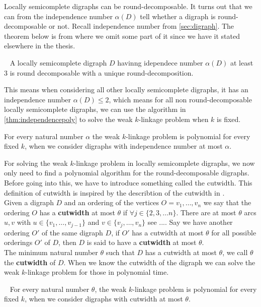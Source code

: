 Locally semicomplete digraphs can be round-decomposable. It turns out that we can from the independence number $\alpha (D)$ tell whether a digraph is round-decomposable or not.
Recall independence number from \autoref{sec:digraph}. 
The theorem below is from \cite{bangJGT77} where we omit some part of it since we have it stated elsewhere in the thesis.
\begin{thm}~\cite{bangJGT77}
    A locally semicomplete digraph $D$ havinng idependece number $\alpha (D)$ at least 3 is round decomposable with a unique round-decomposition. 
    \label{thm:independenceround}
\end{thm} 
This means when considering all other locally semicomplete digraphs, it has an independence number $\alpha (D) \leq 2$, which means for all non round-decomposable locally semicomplete digraphs, we can use the algorithm in \autoref{thm:independencepoly} to solve the weak $k$-linkage problem when $k$ is fixed.
\begin{thm}
        For every natural number $\alpha$ the weak $k$-linkage problem is polynomial for every fixed $k$, when we consider digraphs with independence number at most $\alpha$.
    \label{thm:independencepoly} 
\end{thm}
For solving the weak $k$-linkage problem in locally semicomplete digraphs, we now only need to find a polynomial algorithm for the round-decomposable digraphs.
Before going into this, we have to introduce something called the cutwidth. This definition of cutwidth is inspired by the describtion of the cutwidth in \cite{bangJGT77}.\\
Given a digraph $D$ and an ordering of the vertices $O=v_1,\dots,v_n$ we say that the ordering $O$ has a \textbf{cutwidth} at most $\theta$ if $\forall j\in \lbrace 2,3, \dots n\rbrace$. There are at most $\theta$ arcs $u,v$ with $u\in \lbrace v_1,\dots ,v_{j-1}\rbrace$ and $v\in \lbrace v_j,\dots ,v_n\rbrace$ 
see ....
Say we have another ordering $O'$ of the same digraph $D$, if $O'$ has a cutwidth at most $\theta$ for all possible orderings $O'$ of $D$, then $D$ is said to have a \textbf{cutwidth} at most $\theta$. \\
The minimum natural number $\theta$ such that $D$ has a cutwidth at most $\theta$, we call $\theta$ the \textbf{cutwidth} of $D$.
When we know the cutwidth of the digraph we can solve the weak $k$-linkage problem for those in polynomial time.
\begin{thm}~\cite{bangJGT77}
    For every natural number $\theta$, the weak $k$-linkage problem is polynomial for every fixed $k$, when we consider digraphs with cutwidth at most $\theta$.
    \label{thm:cutwidthklink}
\end{thm}
